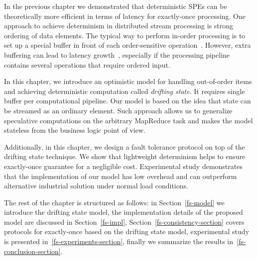 In the previous chapter we demonstrated that deterministic SPEs can be theoretically more efficient in terms of latency for exactly-once processing. One approach to achieve determinism in distributed stream processing is strong ordering of data elements. The typical way to perform in-order processing is to set up a special buffer in front of each order-sensitive operation~\cite{Li:2008:OPN:1453856.1453890}. However, extra buffering can lead to latency growth~\cite{Zacheilas:2017:MDS:3093742.3093921}, especially if the processing pipeline contains several operations that require ordered input. 

In this chapter, we introduce an optimistic model for handling out-of-order items and achieving deterministic computation called {\em drifting state}. It requires single buffer per computational pipeline. Our model is based on the idea that state can be streamed as an ordinary element. Such approach allows us to generalize speculative computations on the arbitrary MapReduce task and makes the model stateless from the business logic point of view.

Additionally, in this chapter, we design a fault tolerance protocol on top of the drifting state technique. We show that lightweight determinism helps to ensure exactly-once guarantee for a negligible cost. Experimental study demonstrates that the implementation of our model has low overhead and can outperform alternative industrial solution under normal load conditions.

The rest of the chapter is structured as follows: in Section~\ref{fs-model} we introduce the drifting state model, the implementation details of the proposed model are discussed in Section~\ref{fs-impl}, Section~\ref{fs-consistency-section} covers protocols for exactly-once based on the drifting state model, experimental study is presented in~\ref{fs-experiments-section}, finally we summarize the results in~\ref{fs-conclusion-section}.